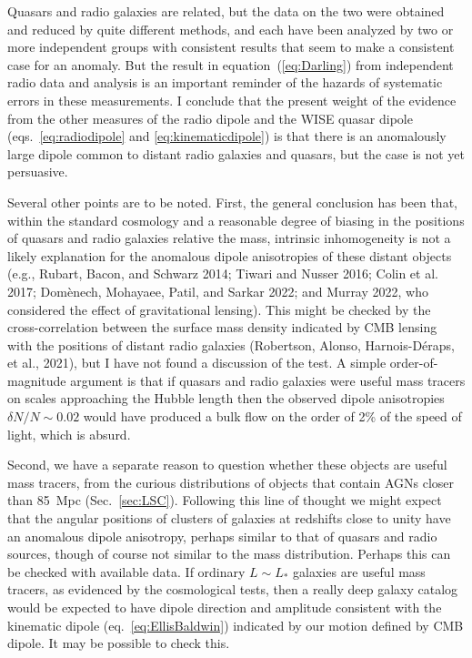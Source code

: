 \documentclass[fleqn,12pt]{article}
\begin{document}
Quasars and radio galaxies are related, but the data on the two were obtained and reduced by quite different methods, and each have been analyzed by two or more independent groups with consistent results that seem to make a consistent case for an anomaly. But the result in equation~(\ref{eq:Darling}) from independent radio data and analysis is an important reminder of the hazards of systematic errors in these measurements. I conclude that the present weight of the evidence from the other measures of the radio dipole and the WISE quasar dipole (eqs.~\ref{eq:radiodipole} and \ref{eq:kinematicdipole}) is that there is an anomalously large dipole common to distant radio galaxies and quasars, but the case is not yet persuasive. 

Several other points are to be noted. First, the general conclusion has been that, within the standard cosmology and a reasonable degree of biasing in the positions of quasars and radio galaxies relative the mass, intrinsic inhomogeneity is not a likely explanation for the anomalous dipole anisotropies of these distant objects  (e.g., Rubart, Bacon, and Schwarz 2014; Tiwari and Nusser 2016; Colin et al. 2017; Dom{\`e}nech, Mohayaee, Patil, and Sarkar 2022; and Murray 2022, who considered the effect of gravitational lensing). This might be checked by the cross-correlation between the surface mass density indicated by CMB lensing with the positions of distant radio galaxies (Robertson, Alonso, Harnois-D{\'e}raps, et al., 2021), but I have not found a discussion of the test. A simple order-of-magnitude argument is that if quasars and radio galaxies were useful mass tracers on scales approaching the Hubble length then the observed dipole anisotropies $\delta N/N\sim 0.02$ would have produced a bulk flow on the order of 2\% of the speed of light, which is absurd.

Second, we have a separate reason to question whether these objects are useful mass tracers, from the curious distributions of objects that contain AGNs closer than 85~Mpc (Sec.~\ref{sec:LSC}). Following this line of thought we might expect that the angular positions of clusters of galaxies at redshifts close to unity have an anomalous dipole anisotropy, perhaps similar to that of quasars and radio sources, though of course not similar to the mass distribution. Perhaps this can be checked with available data. If ordinary $L\sim L_\ast$ galaxies are useful mass tracers, as evidenced by the cosmological tests, then a really deep galaxy catalog would be expected to have dipole direction and amplitude consistent with the kinematic dipole (eq.~\ref{eq:EllisBaldwin}) indicated by our motion defined by CMB dipole. It may be possible to check this.
 
\end{document}
